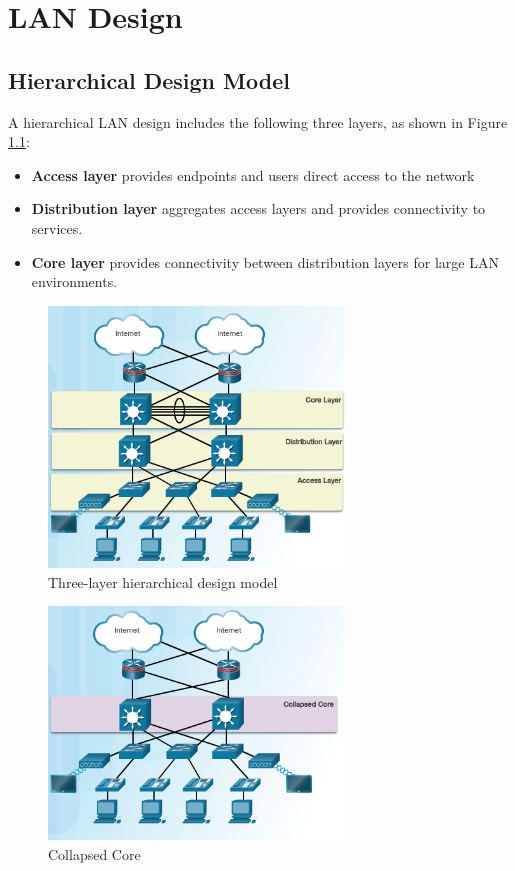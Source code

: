\chapter{LAN Design}

\section{Hierarchical Design Model}

A hierarchical LAN design includes the following three layers, as shown in Figure \ref{Hierarchical-model}:

\begin{itemize}
\item \textbf{Access layer}  provides endpoints and users direct access to the network
\item \textbf{Distribution layer} aggregates access layers and provides connectivity to services. 
\item \textbf{Core layer} provides connectivity between distribution layers for large LAN environments.
\end{itemize}

\begin{figure}[hbtp]
\centering
\includegraphics[width=0.7\textwidth]{pictures/Hierarchical-model.png}
\caption{Three-layer hierarchical design model}
\label{Hierarchical-model}
\end{figure}

\begin{figure}[hbtp]
\centering
\includegraphics[width=0.7\textwidth]{pictures/collapsed-core.png}
\caption{Collapsed Core}
\label{collapsed-core}
\end{figure}

